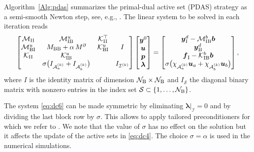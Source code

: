 \documentclass[a4paper,10pt]{article}
\newcommand{\cK}{{\mathcal{K}}}
\newcommand{\cM}{{\mathcal{M}}}
\newcommand{\N}{{\mathcal{N}}}
\numberwithin{theorem}{section}
\begin{document}
Algorithm~\ref{Alg:pdas} summarizes the primal-dual active set (PDAS) strategy as a semi-smooth Newton step, see, e.g., \cite{MBergounioux_KIto_KKunisch_1999a,MMateos_2018}. The linear system to be solved in each iteration reads
\begin{equation}\label{eq:dc6}
  \begin{bmatrix}
    \cM_{\textup{II}} & \cM_{\textup{IB}}^u                       & \cK_{\textup{II}}^\top  &  \\
    \cM_{\textup{BI}}^u & M_{\textup{BB}} + \alpha\,M^\partial & \cK_{\textup{BI}}^u       & I \\
    \cK_{\textup{II}} & \cK_{\textup{IB}}^u                       &                         &                   \\
     & \sigma \big( I_{\mathcal{A}_a^{(k)}} + I_{\mathcal{A}_b^{(k)}} \big) &                   &I_{\mathcal{I}^{(k)}}
  \end{bmatrix}
  \begin{bmatrix}
    \boldsymbol{y}^0 \\
    \boldsymbol{u} \\
    \boldsymbol{p} \\
    \boldsymbol{\lambda}
  \end{bmatrix}
  =
  \begin{bmatrix}
    \boldsymbol{y}^d_{\textup{I}}- \cM_{\textup{IB}}^b \boldsymbol b \\
    \boldsymbol{y}^d_{\textup{B}} \\
    \boldsymbol{f}_{\textup{I}} - \cK_{\textup{IB}}^b \boldsymbol b\\
    \sigma \big( \chi_{\mathcal{A}_a^{(k)}} \boldsymbol{u}_a  + \chi_{\mathcal{A}_b^{(k)}} \boldsymbol{u}_b \big)
  \end{bmatrix},
\end{equation}
where $I$ is the identity matrix of dimension $\N_{\textup{B}}\times \N_{\textup{B}}$ and $I_{\mathcal S}$ the diagonal binary matrix with nonzero entries in the index set $\mathcal S\subset \{1,\ldots,\N_{\textup{B}}\}$.

The system \eqref{eq:dc6} can be made symmetric by eliminating $\boldsymbol{\lambda}|_{\mathcal I} = 0$ and by dividing the last block row by $\sigma$. This allows to apply tailored preconditioners for which we refer to \cite{JWPearson_JPestana_2020,MPorcelli_VSimoncini_MTani_2015}. We note that the value of $\sigma$ has no effect on the solution but it affects the update of the active  sets in \eqref{eq:dc4}. The choice $\sigma = \alpha$ is used in the numerical simulations.
\end{document}
